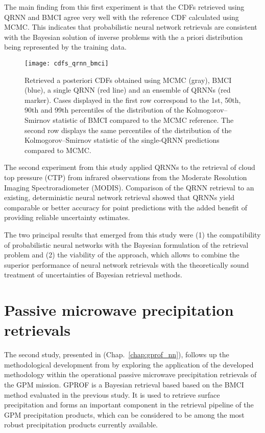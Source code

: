 The main finding from this first experiment is that the CDFs retrieved using
QRNN and BMCI agree very well with the reference CDF calculated using MCMC. This
indicates that probabilistic neural network retrievals are consistent with the
Bayesian solution of inverse problems with the a priori distribution being
represented by the training data.

\begin{figure}
  \centering
  \texttt{[image: cdfs\_qrnn\_bmci]}
  \caption{ Retrieved a posteriori CDFs obtained using MCMC (gray), BMCI (blue),
    a single QRNN (red line) and an ensemble of QRNNs (red marker). Cases
    displayed in the first row correspond to the 1st, 50th, 90th and 99th
    percentiles of the distribution of the Kolmogorov– Smirnov statistic of BMCI
    compared to the MCMC reference. The second row displays the same percentiles
    of the distribution of the Kolmogorov–Smirnov statistic of the single-QRNN
    predictions compared to MCMC.}
  \label{fig:contributions:cdfs_qrnn_bmci}
\end{figure}

The second experiment from this study applied QRNNs to the retrieval of cloud
top pressure (CTP) from infrared observations from the Moderate Resolution
Imaging Spectroradiometer (MODIS). Comparison of the QRNN retrieval to an
existing, deterministic neural network retrieval showed that QRNNs yield
comparable or better accuracy for point predictions with the added benefit of
providing reliable uncertainty estimates.

The two principal results that emerged from this study were (1) the
compatibility of probabilistic neural networks with the Bayesian formulation of
the retrieval problem and (2) the viability of the approach, which allows to
combine the superior performance of neural network retrievals with the
theoretically sound treatment of uncertainties of Bayesian retrieval methods.

\section{Passive microwave precipitation retrievals}

The second study, presented in \citet{pfreundschuh22}
(Chap.~\ref{chap:gprof_nn}), follows up the methodological development from
\citet{pfreundschuh18} by exploring the application of the developed methodology
within the operational passive microwave precipitation retrievals of the GPM
mission.  GPROF is a Bayesian retrieval based based
on the BMCI method evaluated in the previous study. It is used to retrieve
surface precipitation and forms an important component in the retrieval pipeline
of the GPM precipitation products, which can be considered to be among the most
robust precipitation products currently available.

